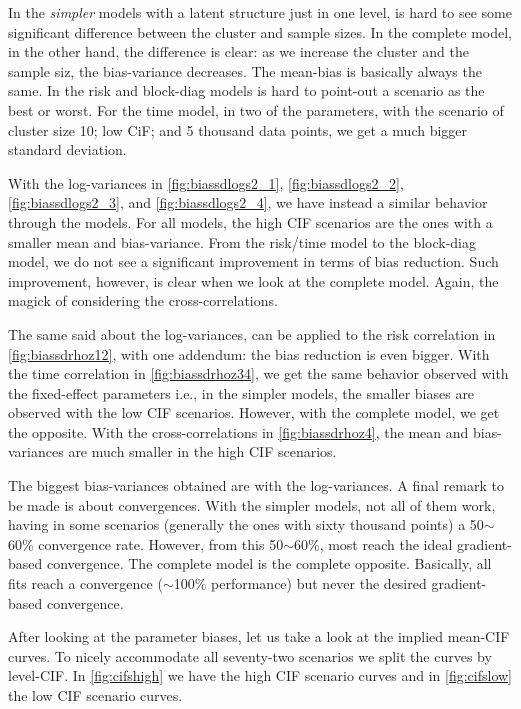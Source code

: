 In the \textit{simpler} models with a latent structure just in one
level, is hard to see some significant difference between the cluster
and sample sizes. In the complete model, in the other hand, the
difference is clear: as we increase the cluster and the sample siz, the
bias-variance decreases. The mean-bias is basically always the same. In
the risk and block-diag models is hard to point-out a scenario as the
best or worst. For the time model, in two of the parameters, with the
scenario of cluster size 10; low CiF; and 5 thousand data points, we get
a much bigger standard deviation.

With the log-variances in \autoref{fig:biassdlogs2_1},
\autoref{fig:biassdlogs2_2}, \autoref{fig:biassdlogs2_3}, and
\autoref{fig:biassdlogs2_4}, we have instead a similar behavior through
the models. For all models, the high CIF scenarios are the ones with a
smaller mean and bias-variance. From the risk/time model to the
block-diag model, we do not see a significant improvement in terms of
bias reduction. Such improvement, however, is clear when we look at the
complete model. Again, the magick of considering the cross-correlations.

The same said about the log-variances, can be applied to the risk
correlation in \autoref{fig:biassdrhoz12}, with one addendum: the bias
reduction is even bigger. With the time correlation in
\autoref{fig:biassdrhoz34}, we get the same behavior observed with the
fixed-effect parameters i.e., in the simpler models, the smaller biases
are observed with the low CIF scenarios. However, with the complete
model, we get the opposite. With the cross-correlations in
\autoref{fig:biassdrhoz4}, the mean and bias-variances are much smaller
in the high CIF scenarios.

The biggest bias-variances obtained are with the log-variances. A final
remark to be made is about convergences. With the simpler models, not
all of them work, having in some scenarios (generally the ones with
sixty thousand points) a 50\(\sim\)60\% convergence rate. However, from
this 50\(\sim\)60\%, most reach the ideal gradient-based
convergence. The complete model is the complete opposite. Basically, all
fits reach a convergence (\(\sim\)100\% performance) but never the
desired gradient-based convergence.

After looking at the parameter biases, let us take a look at the implied
mean-CIF curves. To nicely accommodate all seventy-two scenarios we
split the curves by level-CIF. In \autoref{fig:cifshigh} we have the
high CIF scenario curves and in \autoref{fig:cifslow} the low CIF
scenario curves.

